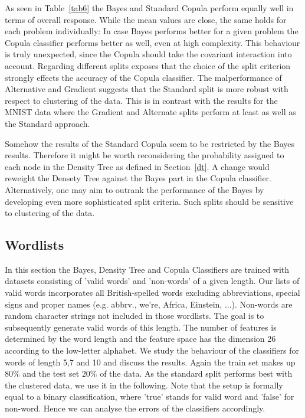 \documentclass[draft]{article}
\begin{document}
As seen in Table~\ref{tab6} the Bayes and Standard Copula perform equally well in terms
of overall response. While the mean values are close, the same holds
for each problem individually: In case Bayes performs better for a given problem
the Copula classifier performs better as well, even at high complexity.
This behaviour is truly unexpected,
since the Copula should take the covariant interaction into account.
\newline
Regarding different splits exposes that the choice of the split criterion
strongly effects the accuracy of the Copula classifier.
The malperformance of Alternative and Gradient suggests that the Standard split
is more robust with respect to clustering of the data.
This is in contrast with the results for the MNIST data where the Gradient
and Alternate splits perform at least as well as the Standard approach.
\newline

Somehow the results of the Standard Copula seem to be restricted by the Bayes results.
Therefore it might be worth reconsidering the probability assigned to each node in the Density Tree
as defined in Section~\ref{dt}.
A change would reweight the Densety Tree against the Bayes part in the Copula classifier.
Alternatively, one may aim to outrank the performance of the Bayes
by developing even more sophisticated split criteria.
Such splits should be sensitive to clustering of the data.



\subsection{Wordlists}
In this section the Bayes, Density Tree and Copula Classifiers are trained
with datasets consisting of 'valid words' and 'non-words' of a given length.
Our lists of valid words incorporates all British-spelled words
excluding abbreviations, special signs and proper names (e.g. abbrv., we're, Africa, Einstein, ...).
Non-words are random character strings not included in those wordlists.
The goal is to subsequently generate valid words of this length.
\newline
The number of features is determined by the word length
and the feature space has the dimension 26 according to the low-letter alphabet.
We study the behaviour of the classifiers for words of length 5,7 and 10 and discuss the results.
Again the train set makes up $80\%$ and the test set $20\%$ of the data.
As the standard split performs best with the clustered data,
we use it in the following.
\newline
Note that the setup is formally equal to a binary classification,
where 'true' stands for valid word and 'false' for non-word.
Hence we can analyse the errors of the classifiers accordingly.
\end{document}
